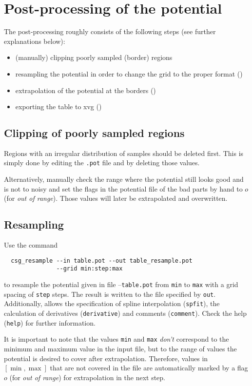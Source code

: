 \section{Post-processing of the potential}
The post-processing roughly consists of the following steps (see further explanations below):
\begin{itemize}
  \item (manually) clipping poorly sampled (border) regions
  \item resampling the potential in order to change the grid to the proper format ()
  \item extrapolation of the potential at the borders ()
  \item exporting the table to xvg ()
\end{itemize}

\subsection*{Clipping of poorly sampled regions}
Regions with an irregular distribution of samples should be deleted first. This is simply done by editing the \texttt{.pot} file and by deleting those values.

Alternatively, manually check the range where the potential still looks good and is not to noisy and set the flags in the potential file of the bad parts by hand to $o$ (for \textit{out of range}). Those values will later be extrapolated and overwritten.

\subsection*{Resampling}
Use the command
\begin{verbatim}
  csg_resample --in table.pot --out table_resample.pot
               --grid min:step:max
\end{verbatim}
to resample the potential given in file --\texttt{table.pot} from \texttt{min} to \texttt{max} with a grid spacing of \texttt{step} steps. The result is written to the file specified by \texttt{out}. Additionally,  allows the specification of spline interpolation (\texttt{spfit}), the calculation of derivatives (\texttt{derivative}) and comments (\texttt{comment}). Check the help (\texttt{help}) for further information.

It is important to note that the values \texttt{min} and \texttt{max} \textit{don't} correspond to the minimum and maximum value in the input file, but to the range of values the potential is desired to cover after extrapolation. Therefore, values in $[ \min,\max ]$ that are not covered in the file are automatically marked by a flag $o$ (for \textit{out of range}) for extrapolation in the next step.

